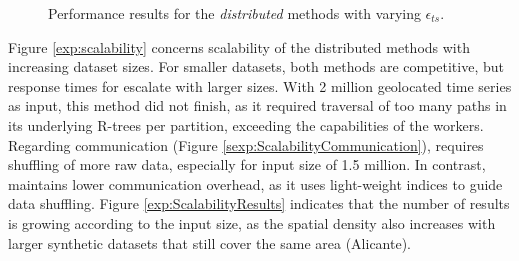 \begin{figure}[!ht]
 \centering
 \caption{Performance results for the {\em distributed} methods with varying $\epsilon_{ts}$.}
 \label{exp:distr_EpsTS}
\end{figure}

Figure \ref{exp:scalability} concerns scalability of the distributed methods with increasing dataset sizes. For smaller datasets, both methods are competitive, but response times for \base escalate with larger sizes. With 2 million geolocated time series as input, this method did not finish, as it required traversal of too many paths in its underlying R-trees per partition, exceeding the capabilities of the workers. Regarding communication (Figure \ref{sexp:ScalabilityCommunication}), \base requires shuffling of more raw data, especially for input size of 1.5 million. In contrast, \opt maintains lower communication overhead, as it uses light-weight indices to guide data shuffling. Figure \ref{exp:ScalabilityResults} indicates that the number of results is growing according to the input size, as the spatial density also increases with larger synthetic datasets that still cover  the same area (Alicante).

